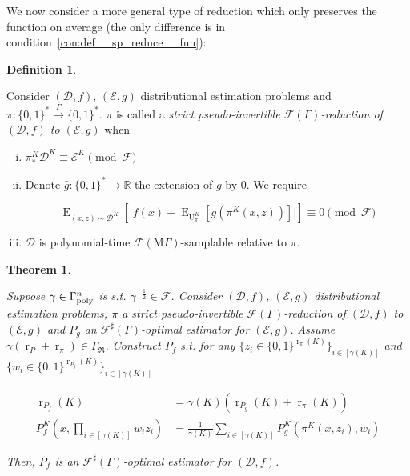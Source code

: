 \documentclass[11pt]{article}
\numberwithin{equation}{section}
\theoremstyle{definition}
\newtheorem{definition}{Definition}[section]
\theoremstyle{plain}
\newtheorem{theorem}{Theorem}[section]
\newcommand{\Bool}{\{0,1\}}
\newcommand{\Words}{{\Bool^*}}
\DeclareMathOperator{\E}{E}
\DeclareMathOperator{\R}{r}
\DeclareMathOperator{\Un}{U}
\newcommand{\Reals}{\mathbb{R}}
\newcommand{\Abs}[1]{\lvert #1 \rvert}
\newcommand{\Dist}{\mathcal{D}}
\newcommand{\GrowR}{\Gamma_{\mathfrak{R}}}
\newcommand{\MGrow}{\mathrm{M}\Gamma}
\newcommand{\Fall}{\mathcal{F}}
\newcommand{\EG}{\Fall(\Gamma)}
\newcommand{\ESG}{\Fall^\sharp(\Gamma)}
\newcommand{\EMG}{\Fall(\MGrow)}
\newcommand{\BoolR}[1]{\Bool^{\R_{#1}(K)}}
\newcommand{\GammaPoly}{\Gamma_{\textnormal{poly}}}
\newcommand{\Scheme}{\xrightarrow{\Gamma}}
\begin{document}
We now consider a more general type of reduction which only preserves the function on average (the only difference is in condition~\ref{con:def__sp_reduce__fun}):

\begin{samepage}
\begin{definition}
\label{def:sp_reduce}

Consider $(\Dist,f)$, $(\mathcal{E},g)$ distributional estimation problems and ${\pi: \Words \Scheme \Words}$. $\pi$ is called a \emph{strict pseudo-invertible $\EG$-reduction of $(\Dist,f)$ to $(\mathcal{E},g)$} when

\begin{enumerate}[(i)]

\item\label{con:def__sp_reduce__dist} $\pi_*^K\Dist^{K} \equiv \mathcal{E}^{K} \pmod \Fall$

\item\label{con:def__sp_reduce__fun} Denote ${\bar{g}: \Words \rightarrow \Reals}$ the extension of $g$ by 0. We require

\[\E_{(x,z) \sim \Dist^{K}}[\Abs{f(x)-\E_{\Un_\pi^{K}}[g(\pi^{K}(x,z))]}] \equiv 0 \pmod \Fall\]

\item\label{con:def__sp_reduce__smp} $\Dist$ is polynomial-time $\EMG$-samplable relative to $\pi$.

\end{enumerate}

\end{definition}
\end{samepage}

\begin{samepage}
\begin{theorem}
\label{thm:sp_reduce_sharp}

Suppose $\gamma \in \GammaPoly^n$ is s.t. $\gamma^{-\frac{1}{2}} \in \Fall$. Consider $(\Dist,f)$, $(\mathcal{E},g)$ distributional estimation problems, $\pi$ a strict pseudo-invertible $\EG$-reduction of $(\Dist, f)$ to $(\mathcal{E}, g)$ and $P_g$ an $\ESG$-optimal estimator for $(\mathcal{E}, g)$. Assume $\gamma (\R_P + \R_\pi) \in \GrowR$. Construct ${P_f}$ s.t. for any ${\{z_i \in \BoolR{\pi}\}_{i \in [\gamma(K)]}}$ and ${\{w_i \in \BoolR{P_g}\}_{i \in [\gamma(K)]}}$

\begin{align}
\label{eqn:thm__sp_reduce__rpf}\R_{P_f}(K) &= \gamma(K) (\R_{P_g}(K) + \R_\pi(K)) \\
\label{eqn:thm__sp_reduce__pf}P_f^K\left(x, \prod_{i \in [\gamma(K)]} w_i z_i\right) &= \frac{1}{\gamma(K)}\sum_{i \in [\gamma(K)]} P_g^K(\pi^K(x,z_i),w_i)
\end{align}

Then, $P_f$ is an $\ESG$-optimal estimator for $(\Dist, f)$.

\end{theorem}
\end{samepage}
\end{document}
